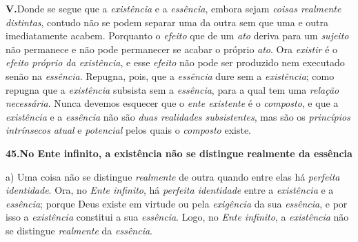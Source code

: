 \documentclass[12pt,a4paper]{article}
\newcommand{\teseB}[2]{\bigskip\noindent\textbf{#1.\quad #2}\par}
\newcommand{\subp}[1]{\medskip\noindent#1)\quad}
\begin{document}
\medskip
\noindent\textbf{V.}\quad Donde se segue que a \emph{existência} e a
\emph{essência}, embora sejam \emph{coisas realmente distintas}, contudo não se
podem separar uma da outra sem que uma e outra imediatamente acabem. Porquanto
o \emph{efeito} que de um \emph{ato} deriva para um \emph{sujeito} não permanece
e não pode permanecer se acabar o próprio \emph{ato}. Ora \emph{existir} é o
\emph{efeito próprio da existência}, e esse \emph{efeito} não pode ser produzido
nem executado senão na \emph{essência}. Repugna, pois, que a \emph{essência}
dure sem a \emph{existência}; como repugna que a \emph{existência} subsista sem
a \emph{essência}, para a qual tem uma \emph{relação necessária}. \textemdash{}
Nunca devemos esquecer que o \emph{ente existente} é o \emph{composto}, e que a
\emph{existência} e a \emph{essência} não são \emph{duas realidades
subsistentes}, mas são os \emph{princípios intrínsecos} \textemdash{}
\emph{atual} e \emph{potencial} \textemdash{} pelos quais o \emph{composto}
existe.

\teseB{45}{No Ente infinito, a existência não se distingue realmente da
essência}

\subp{a} Uma coisa não se distingue \emph{realmente} de outra quando entre elas
há \emph{perfeita identidade}. Ora, no \emph{Ente infinito}, há \emph{perfeita
identidade} entre a \emph{existência} e a \emph{essência}; porque Deus existe em
virtude ou pela \emph{exigência} da sua \emph{essência}, e por isso a
\emph{existência} constitui a sua \emph{essência}. Logo, no \emph{Ente
infinito}, a \emph{existência} não se distingue \emph{realmente} da
\emph{essência}.
\end{document}
